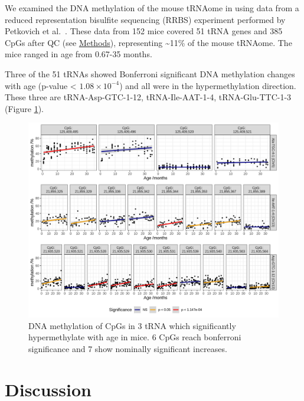 \documentclass[]{book}
\begin{document}
We examined the DNA methylation of the mouse tRNAome in using data from a reduced representation bisulfite sequencing (RRBS) experiment performed by Petkovich et al.~\citep{Petkovich2017}.
These data from 152 mice covered 51 tRNA genes and 385 CpGs after QC (see \protect\hyperlink{mousemethods}{Methods}), representing \textasciitilde11\% of the mouse tRNAome.
The mice ranged in age from 0.67-35 months.

Three of the 51 tRNAs showed Bonferroni significant DNA methylation changes with age (p-value \textless{} \(1.08 \times 10^{-4}\)) and all were in the hypermethylation direction.
These three are tRNA-Asp-GTC-1-12, tRNA-Ile-AAT-1-4, tRNA-Glu-TTC-1-3 (Figure \ref{fig:mouse}).

\begin{figure}

{\centering \includegraphics[width=1\linewidth]{./figs/CpGPlotComb} 

}

\caption{DNA methylation of CpGs in 3 tRNA which significantly hypermethylate with age in mice. 6 CpGs reach bonferroni significance and 7 show nominally significant increases.}\label{fig:mouse}
\end{figure}



\newpage

\hypertarget{discussion-2}{%
\section{Discussion}\label{discussion-2}}
\end{document}
